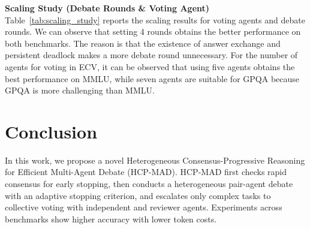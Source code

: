 \documentclass[11pt]{article}
\begin{document}



\noindent\textbf{Scaling Study (Debate Rounds \& Voting Agent)}
Table~\ref{tab:scaling_study} reports the scaling results for voting agents and debate rounds.%
We can observe that setting 4 rounds obtains the better performance on both benchmarks.
The reason is that the existence of answer exchange and persistent deadlock makes a more debate round unnecessary. 
For the number of agents for voting in ECV, it can be observed that using five agents obtains the best performance on MMLU, while seven agents are suitable for GPQA because GPQA is more challenging than MMLU.

\section{Conclusion}
In this work, we propose a novel Heterogeneous Consensus-Progressive Reasoning for Efficient Multi-Agent Debate (HCP-MAD).
HCP-MAD first checks rapid consensus for early stopping, then conducts a heterogeneous pair-agent debate with an adaptive stopping criterion, and escalates only complex tasks to collective voting with independent and reviewer agents. 
Experiments across benchmarks show higher accuracy with lower token costs. 
\newpage
\end{document}
